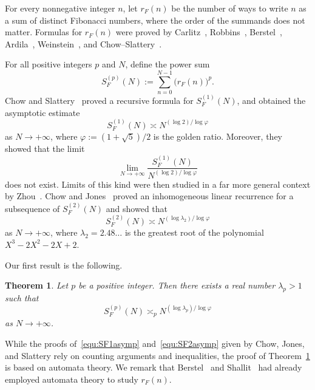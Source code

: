 \documentclass[11pt]{article}
\newtheorem{theorem}{Theorem}[section]
\theoremstyle{remark}\newtheorem{remark}[theorem]{Remark}
\begin{document}
For every nonnegative integer $n$, let $r_F(n)$ be the number of ways to write $n$ as a sum of distinct Fibonacci numbers, where the order of the summands does not matter.
Formulas for $r_F(n)$ were proved by Carlitz~\cite{MR0236094}, Robbins~\cite{MR1394758}, Berstel~\cite{MR1922290}, Ardila~\cite{MR2093874}, Weinstein~\cite{MR3499711}, and Chow--Slattery~\cite{MR4235264}.

For all positive integers $p$ and $N$, define the power sum
\begin{equation*}
	S_{F}^{(p)}(N) := \sum_{n = 0}^{N - 1} \big(r_F(n)\big)^p .
\end{equation*}
Chow and Slattery~\cite{MR4235264} proved a recursive formula for $S_{F}^{(1)}(N)$, and obtained the asymptotic estimate
\begin{equation}\label{equ:SF1asymp}
	S_F^{(1)}(N) \asymp N^{(\log 2) /\! \log \varphi}
\end{equation}
as $N \to +\infty$, where $\varphi := (1 + \sqrt{5}) / 2$ is the golden ratio. Moreover, they showed that the limit
\begin{equation*}
	\lim_{N \to +\infty} \frac{S_F^{(1)}(N)}{N^{(\log 2) /\! \log \varphi}}
\end{equation*}
does not exist.
Limits of this kind were then studied in a far more general context by Zhou~\cite{preprintZhou23}.
Chow and Jones~\cite{preprintCJ23} proved an inhomogeneous linear recurrence for a subsequence of $S_F^{(2)}(N)$ and showed that
\begin{equation}\label{equ:SF2asymp}
	S_F^{(2)}(N) \asymp N^{(\log \lambda_2) /\! \log \varphi}
\end{equation}
as $N \to +\infty$, where $\lambda_2 = 2.48\dots$ is the greatest root of the polynomial $X^3 - 2X^2 - 2X + 2$.

Our first result is the following.

\begin{theorem}\label{thm:main}
	Let $p$ be a positive integer.
	Then there exists a real number $\lambda_p > 1$ such that
	\begin{equation}\label{equ:main-asymp}
		S^{(p)}_F(N) \asymp_p N^{(\log \lambda_p) /\!\log \varphi}
	\end{equation}
	as $N \to +\infty$.
\end{theorem}

While the proofs of~\eqref{equ:SF1asymp} and~\eqref{equ:SF2asymp} given by Chow, Jones, and Slattery rely on counting arguments and inequalities, the proof of Theorem~\ref{thm:main} is based on automata theory.
We remark that Berstel~\cite{MR1922290} and Shallit~\cite{MR4195833} had already employed automata theory to study $r_F(n)$.
\end{document}
